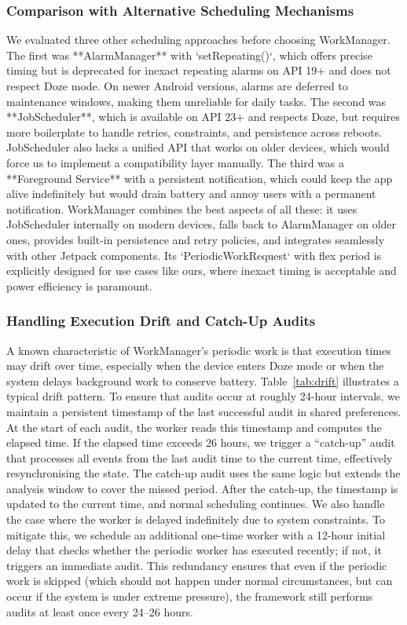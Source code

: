 \subsubsection{Comparison with Alternative Scheduling Mechanisms}

We evaluated three other scheduling approaches before choosing WorkManager. The first was **AlarmManager** with `setRepeating()`, which offers precise timing but is deprecated for inexact repeating alarms on API 19+ and does not respect Doze mode. On newer Android versions, alarms are deferred to maintenance windows, making them unreliable for daily tasks. The second was **JobScheduler**, which is available on API 23+ and respects Doze, but requires more boilerplate to handle retries, constraints, and persistence across reboots. JobScheduler also lacks a unified API that works on older devices, which would force us to implement a compatibility layer manually. The third was a **Foreground Service** with a persistent notification, which could keep the app alive indefinitely but would drain battery and annoy users with a permanent notification. WorkManager combines the best aspects of all these: it uses JobScheduler internally on modern devices, falls back to AlarmManager on older ones, provides built-in persistence and retry policies, and integrates seamlessly with other Jetpack components. Its `PeriodicWorkRequest` with flex period is explicitly designed for use cases like ours, where inexact timing is acceptable and power efficiency is paramount.

\subsubsection{Handling Execution Drift and Catch-Up Audits}

A known characteristic of WorkManager's periodic work is that execution times may drift over time, especially when the device enters Doze mode or when the system delays background work to conserve battery. Table~\ref{tab:drift} illustrates a typical drift pattern. To ensure that audits occur at roughly 24-hour intervals, we maintain a persistent timestamp of the last successful audit in shared preferences. At the start of each audit, the worker reads this timestamp and computes the elapsed time. If the elapsed time exceeds 26 hours, we trigger a ``catch-up'' audit that processes all events from the last audit time to the current time, effectively resynchronising the state. The catch-up audit uses the same logic but extends the analysis window to cover the missed period. After the catch-up, the timestamp is updated to the current time, and normal scheduling continues. We also handle the case where the worker is delayed indefinitely due to system constraints. To mitigate this, we schedule an additional one-time worker with a 12-hour initial delay that checks whether the periodic worker has executed recently; if not, it triggers an immediate audit. This redundancy ensures that even if the periodic work is skipped (which should not happen under normal circumstances, but can occur if the system is under extreme pressure), the framework still performs audits at least once every 24–26 hours.

